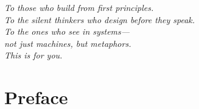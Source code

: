 \documentclass[12pt, oneside, openany]{book}
\let\oldchapter\chapter
\renewcommand{\chapter}{
	\cleardoublepage
	\thispagestyle{chapter}
	\oldchapter
}
\begin{document}
\thispagestyle{empty}
\vspace*{6cm}
\begin{center}
	\emph{
		To those who build from first principles.\\
		To the silent thinkers who design before they speak.\\
		To the ones who see in systems—\\
		not just machines, but metaphors.\\
		This is for you.}
\end{center}

\pagestyle{empty}
	\chapter{Preface}
	\thispagestyle{empty}
\end{document}
